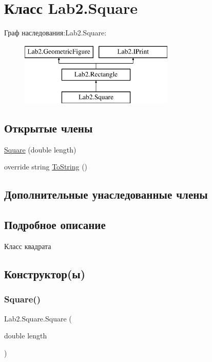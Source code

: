 \hypertarget{class_lab2_1_1_square}{}\section{Класс Lab2.\+Square}
\label{class_lab2_1_1_square}
Граф наследования\+:Lab2.\+Square\+:\begin{figure}[H]
\begin{center}
\leavevmode
\includegraphics[height=3.000000cm]{class_lab2_1_1_square}
\end{center}
\end{figure}
\subsection*{Открытые члены}
\begin{DoxyCompactItemize}
\item 
\hyperlink{class_lab2_1_1_square_adf14884086bf810bde5cb9dc18e10a82}{Square} (double length)
\item 
override string \hyperlink{class_lab2_1_1_square_ac43e17280bb521a3466a38ec0e4742eb}{To\+String} ()
\end{DoxyCompactItemize}
\subsection*{Дополнительные унаследованные члены}


\subsection{Подробное описание}
Класс квадрата 

\subsection{Конструктор(ы)}
\mbox{\label{class_lab2_1_1_square_adf14884086bf810bde5cb9dc18e10a82}} 
\subsubsection{\texorpdfstring{Square()}{Square()}}
{\footnotesize\ttfamily Lab2.\+Square.\+Square (\begin{DoxyParamCaption}\item[{double}]{length }\end{DoxyParamCaption})}

